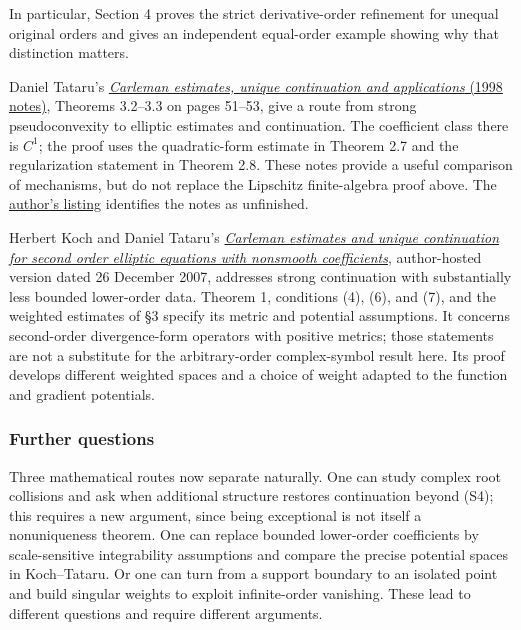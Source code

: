 \documentclass[
  11pt,
]{article}
\begin{document}
In particular, Section 4 proves the strict derivative-order refinement
for unequal original orders and gives an independent equal-order example
showing why that distinction matters.

Daniel Tataru's
\href{https://math.berkeley.edu/~tataru/papers/book.pdf}{\emph{Carleman
estimates, unique continuation and applications} (1998 notes)}, Theorems
3.2--3.3 on pages 51--53, give a route from strong pseudoconvexity to
elliptic estimates and continuation. The coefficient class there is
\(C^1\); the proof uses the quadratic-form estimate in Theorem 2.7 and
the regularization statement in Theorem 2.8. These notes provide a
useful comparison of mechanisms, but do not replace the Lipschitz
finite-algebra proof above. The
\href{https://math.berkeley.edu/~tataru/ucp.html}{author's listing}
identifies the notes as unfinished.

Herbert Koch and Daniel Tataru's
\href{https://math.berkeley.edu/~tataru/papers/esucp3.pdf}{\emph{Carleman
estimates and unique continuation for second order elliptic equations
with nonsmooth coefficients}}, author-hosted version dated 26 December
2007, addresses strong continuation with substantially less bounded
lower-order data. Theorem 1, conditions (4), (6), and (7), and the
weighted estimates of §3 specify its metric and potential assumptions.
It concerns second-order divergence-form operators with positive
metrics; those statements are not a substitute for the arbitrary-order
complex-symbol result here. Its proof develops different weighted spaces
and a choice of weight adapted to the function and gradient potentials.

\subsubsection{Further questions}\label{further-questions}

Three mathematical routes now separate naturally. One can study complex
root collisions and ask when additional structure restores continuation
beyond (S4); this requires a new argument, since being exceptional is
not itself a nonuniqueness theorem. One can replace bounded lower-order
coefficients by scale-sensitive integrability assumptions and compare
the precise potential spaces in Koch--Tataru. Or one can turn from a
support boundary to an isolated point and build singular weights to
exploit infinite-order vanishing. These lead to different questions and
require different arguments.
\end{document}
